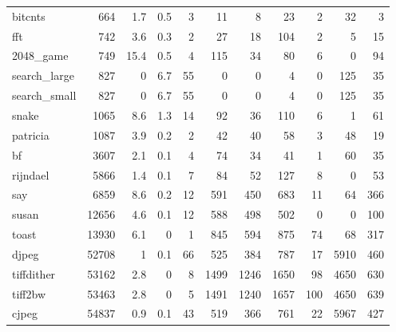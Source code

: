 \begin{tabular}{lrrrrrrrrrr}
 bitcnts         &            664 &      1.7 &    0.5 &    3 &     11 &          8 &           23 &     2 &    32 &     3 \\
 fft             &            742 &      3.6 &    0.3 &    2 &     27 &         18 &          104 &     2 &     5 &    15 \\
 2048\_game       &            749 &     15.4 &    0.5 &    4 &    115 &         34 &           80 &     6 &     0 &    94 \\
 search\_large    &            827 &      0   &    6.7 &   55 &      0 &          0 &            4 &     0 &   125 &    35 \\
 search\_small    &            827 &      0   &    6.7 &   55 &      0 &          0 &            4 &     0 &   125 &    35 \\
 snake           &           1065 &      8.6 &    1.3 &   14 &     92 &         36 &          110 &     6 &     1 &    61 \\
 patricia        &           1087 &      3.9 &    0.2 &    2 &     42 &         40 &           58 &     3 &    48 &    19 \\
 bf              &           3607 &      2.1 &    0.1 &    4 &     74 &         34 &           41 &     1 &    60 &    35 \\
 rijndael        &           5866 &      1.4 &    0.1 &    7 &     84 &         52 &          127 &     8 &     0 &    53 \\
 say             &           6859 &      8.6 &    0.2 &   12 &    591 &        450 &          683 &    11 &    64 &   366 \\
 susan           &          12656 &      4.6 &    0.1 &   12 &    588 &        498 &          502 &     0 &     0 &   100 \\
 toast           &          13930 &      6.1 &    0   &    1 &    845 &        594 &          875 &    74 &    68 &   317 \\
 djpeg           &          52708 &      1   &    0.1 &   66 &    525 &        384 &          787 &    17 &  5910 &   460 \\
 tiffdither      &          53162 &      2.8 &    0   &    8 &   1499 &       1246 &         1650 &    98 &  4650 &   630 \\
 tiff2bw         &          53463 &      2.8 &    0   &    5 &   1491 &       1240 &         1657 &   100 &  4650 &   639 \\
 cjpeg           &          54837 &      0.9 &    0.1 &   43 &    519 &        366 &          761 &    22 &  5967 &   427 \\

\end{tabular}
